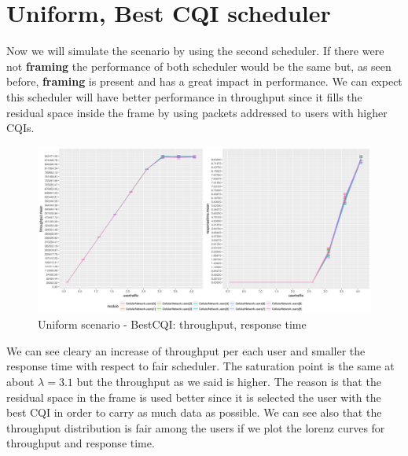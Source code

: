 \section{Uniform, Best CQI scheduler}
Now we will simulate the scenario by using the second scheduler. If there were not \textbf{framing} the performance of both scheduler would be the same but, as seen before, \textbf{framing} is present and has a great impact in performance. We can expect this scheduler will have better performance in throughput since it fills the residual space inside the frame by using packets addressed to users with higher CQIs.
\begin{figure}[H]
  \includegraphics[width=1\textwidth]{images/unifbest}
   \caption{Uniform scenario - BestCQI: throughput, response time}
  \label{fig:Uniform scenario - BestCQI: throughput, response time}
\end{figure}
We can see cleary an increase of throughput per each user and smaller the response time with respect to fair scheduler. The saturation point is the same at about \(\lambda=3.1\) but the throughput as we said is higher. The reason is that the residual space in the frame is used better since it is selected the user with the best CQI in order to carry as much data as possible. We can see also that the throughput distribution is fair among the users if we plot the lorenz curves for throughput and response time.
